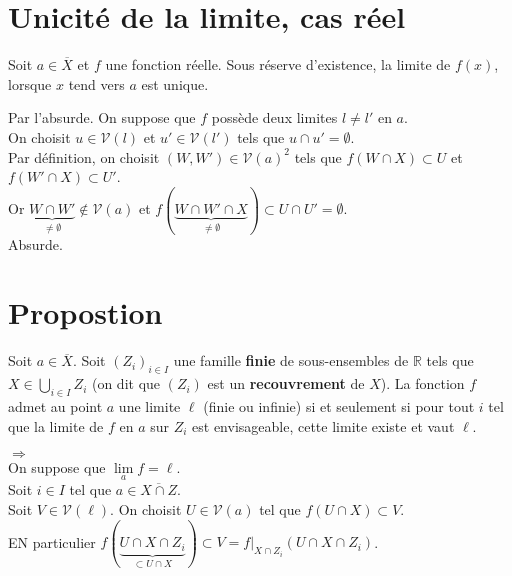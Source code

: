 \documentclass[../main.tex]{subfiles}
\begin{document}
\setcounter{section}{16}
\section{Unicité de la limite, cas réel}
\begin{tcolorbox}[title=Théorème 15.17, title filled=false, colframe=orange, colback=orange!10!white]
    Soit $a \in \overline{X}$ et $f$ une fonction réelle. Sous réserve d'existence, la limite de $f(x)$, lorsque $x$ tend vers $a$ est unique. 
\end{tcolorbox}

Par l'absurde. On suppose que $f$ possède deux limites $l \neq l'$ en $a$. \\
On choisit $u \in \mathcal{V}(l)$ et $u' \in \mathcal{V}(l')$ tels que $u \cap u' = \emptyset$. \\
Par définition, on choisit $(W, W') \in \mathcal{V}(a)^2$ tels que $f(W \cap X) \subset U$ et $f(W' \cap X) \subset U'$. \\
Or $\underbrace{W \cap W'}_{\neq \emptyset} \not \in \mathcal{V}(a)$ et $f(\underbrace{W \cap W' \cap X}_{\neq \emptyset}) \subset U \cap U' = \emptyset$. \\
Absurde.

\setcounter{section}{22}
\section{Propostion}
\begin{tcolorbox}[title=Propostion 15.23, title filled=false, colframe=lightblue, colback=lightblue!10!white]
    Soit $a \in \overline{X}$. Soit $(Z_i)_{i\in I}$ une famille \textbf{finie} de sous-ensembles de $\mathbb{R}$ tels que $X \in \bigcup\limits_{i \in I} Z_i$ (on dit que $(Z_i)$ est un \textbf{recouvrement} de $X$). La fonction $f$ admet au point $a$ une limite $\ell$ (finie ou infinie) si et seulement si pour tout $i$ tel que la limite de $f$ en $a$ sur $Z_i$ est envisageable, cette limite existe et vaut $\ell$. 
\end{tcolorbox}

$\boxed{\Rightarrow}$ \\
On suppose que $\lim\limits_a f = \ell$. \\
Soit $i \in I$ tel que $a \in \overline{X \cap Z}$. \\
Soit $V \in \mathcal{V}(\ell)$. On choisit $U \in \mathcal{V}(a)$ tel que $f(U \cap X) \subset V$. \\
EN particulier $f(\underbrace{U\cap X \cap Z_i}_{\subset U \cap X}) \subset V = \left. f \right|_{X \cap Z_i} (U \cap X \cap Z_i)$. \\ \\
\end{document}
